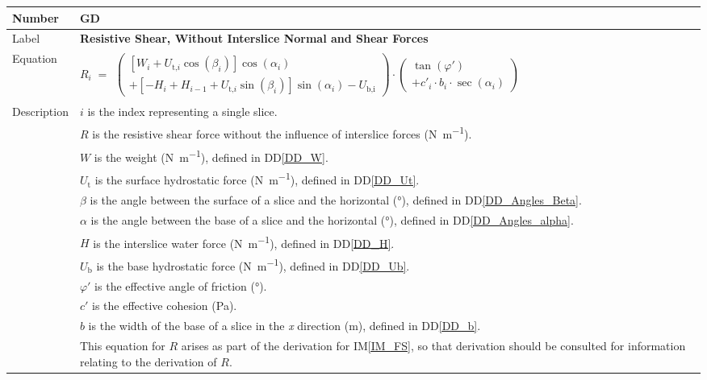 \documentclass[12pt]{article}
\newcommand{\colAwidth}{0.13\textwidth}
\newcommand{\colBwidth}{0.82\textwidth}
\renewcommand{\arraystretch}{1}
\newcommand{\iref}[1]{IM\ref{#1}}
\newcommand{\ddref}[1]{DD\ref{#1}}
\newcounter{defnum} %
\begin{document}
\noindent
\begin{minipage}{\textwidth}
	\renewcommand*{\arraystretch}{1.5}
	\begin{tabular}{| p{\colAwidth} | p{\colBwidth} |}
		
		\hline \rowcolor[gray]{0.9} Number&
		GD{defnum}\thedefnum \label{GD_R}\\
		
		\hline Label& \bf Resistive Shear, Without Interslice Normal and Shear 
		Forces \\
		
		\hline
		Equation & 
		$R_i \; = \begin{array}{l}
		\left( \begin{array}{l}
		\left[ W_{i} + U_{\text{t,}i}
		\cos\left(\beta_{i}\right) \right]
		\cos\left(\alpha_{i}\right) \\
		+ \left[ - H_{i} + H_{i-1} +
		U_{\text{t,}i} \sin\left(\beta_{i}\right) \right]
		\sin\left(\alpha_{i}\right) - U_{\text{b,i}} \end{array}
		\right) \cdot \left( \begin{array}{l} \tan\left(\varphi'\right)\\
		+ c'_{i} \cdot b_{i} \cdot
		\sec\left(\alpha_{i}\right) \end{array} \right) \end{array}$\\
		
		\hline Description &$i$ is the index representing a single slice.\\
		&$R$ is the resistive shear force without the influence of interslice 
		forces
		(\si{\newton\per\meter}).\\
		&$W$ is the weight (\si{\newton\per\meter}), defined in \ddref{DD_W}.\\
		&${U_{\text{t}}}$ is the surface hydrostatic force 
		(\si{\newton\per\meter}), defined in \ddref{DD_Ut}.\\
		&$\beta{}$ is the angle between the surface of a slice and the 
		horizontal (\si{\degree}), defined in \ddref{DD_Angles_Beta}.\\
		&$\alpha{}$ is the angle between the base of a slice and the 
		horizontal (\si{\degree}), defined in \ddref{DD_Angles_alpha}.\\
		&$H$ is the interslice water force (\si{\newton\per\meter}), defined in 
		\ddref{DD_H}.\\
		&${U_{\text{b}}}$ is the base hydrostatic force 
		(\si{\newton\per\meter}), defined in \ddref{DD_Ub}.\\
		&$\varphi{}'$ is the effective angle of friction (\si{\degree}).\\
		&$c'$ is the effective cohesion (Pa).\\
		&$b$ is the width of the base of a slice in the \textit{x} direction 
		(\si{\meter}), defined in \ddref{DD_b}.\\
		&This equation for $R$ arises as part of the derivation for 
		\iref{IM_FS}, so that derivation should be consulted for information 
		relating to the derivation of $R$.\\
		

\end{tabular}
\end{minipage}
\end{document}
